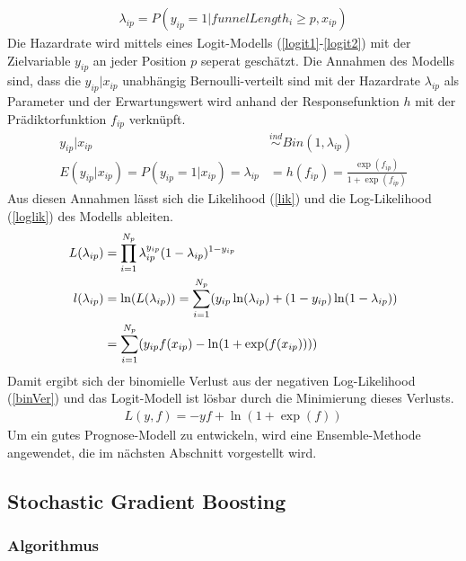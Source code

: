 \begin{align}
	\lambda_{ip} = P(y_{ip}=1|funnelLength_i \geq p, x_{ip}) \label{haz}
\end{align}
Die Hazardrate wird mittels eines Logit-Modells (\ref{logit1}-\ref{logit2}) mit der Zielvariable $y_{ip}$ an jeder Position $p$ seperat geschätzt. Die Annahmen des Modells sind, dass die $y_{ip}|x_{ip}$ unabhängig Bernoulli-verteilt sind mit der Hazardrate $\lambda_{ip}$ als Parameter und der Erwartungswert wird anhand der Responsefunktion $h$ mit der Prädiktorfunktion $f_{ip}$ verknüpft.
\begin{align}
	y_{ip}|x_{ip} &\stackrel{ind}{\sim} Bin(1, \lambda_{ip}) \label{logit1} \\
	E(y_{ip}|x_{ip}) = P(y_{ip} = 1|x_{ip}) = \lambda_{ip} &= h(f_{ip}) = \frac{\exp(f_{ip})}{1+\exp(f_{ip})}\label{logit2}
\end{align}
Aus diesen Annahmen lässt sich die Likelihood (\ref{lik}) und die Log-Likelihood (\ref{loglik}) des Modells ableiten.
\begin{align}
	L(\lambda_{ip}) &= \prod_{i=1}^{N_p} \lambda_{ip}^{y_{ip}} (1-\lambda_{ip})^{1-y_{ip}} \label{lik} \\
	l(\lambda_{ip}) &= \ln(L(\lambda_{ip})) = \sum_{i=1}^{N_p} (y_{ip} \ln(\lambda_{ip}) + (1-y_{ip}) \ln(1-\lambda_{ip})) \notag \\
	&= \sum_{i=1}^{N_p} (y_{ip} f(x_{ip}) - \ln(1+\exp(f(x_{ip})))) \label{loglik}
\end{align}
Damit ergibt sich der binomielle Verlust aus der negativen Log-Likelihood (\ref{binVer}) und das Logit-Modell ist lösbar durch die Minimierung dieses Verlusts.
\begin{align}
	L(y,f) = -yf + \ln(1+\exp(f)) \label{binVer}
\end{align}
Um ein gutes Prognose-Modell zu entwickeln, wird eine Ensemble-Methode angewendet, die im nächsten Abschnitt vorgestellt wird.

\subsection{Stochastic Gradient Boosting}\label{secModel2}

\subsubsection*{Algorithmus}

